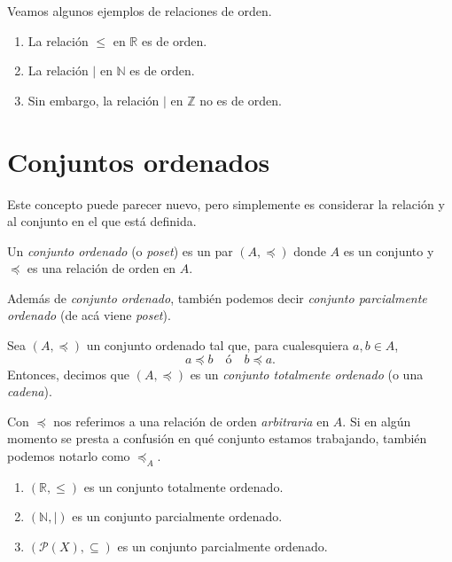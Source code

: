 Veamos algunos ejemplos de relaciones de orden.

\begin{example}
	\begin{enumerate}
		\item La relación $\leq$ en $\mathbb{R}$ es de orden.
		\item La relación $\mid$ en $\mathbb{N}$ es de orden.
		\item Sin embargo, la relación $\mid$ en $\mathbb{Z}$ no es de orden.
	\end{enumerate}
\end{example}


\section{Conjuntos ordenados}

Este concepto puede parecer nuevo, pero simplemente es considerar la relación y al conjunto en el que está definida.

\begin{definition}
	Un \emph{conjunto ordenado} (o \emph{poset}) es un par $(A, \preceq)$ donde $A$ es un conjunto y $\preceq$ es una relación de orden en $A$.
\end{definition}

Además de \textit{conjunto ordenado}, también podemos decir \textit{conjunto parcialmente ordenado} (de acá viene \textit{poset}).

\begin{definition}
	Sea $(A, \preceq)$ un conjunto ordenado tal que, para cualesquiera $a, b \in A$,
	\begin{equation*}
		a \preceq b \quad\text{ó}\quad b \preceq a.
	\end{equation*}
	Entonces, decimos que $(A, \preceq)$ es un \emph{conjunto totalmente ordenado} (o una \emph{cadena}).
\end{definition}

Con $\preceq$ nos referimos a una relación de orden \textit{arbitraria} en $A$. Si en algún momento se presta a confusión en qué conjunto estamos trabajando, también podemos notarlo como $\preceq_{A}$.

\begin{example}
	\noindent
	\begin{enumerate}
		\item $(\mathbb{R}, \leq)$ es un conjunto totalmente ordenado.
		\item $(\mathbb{N}, \mid)$ es un conjunto parcialmente ordenado.
		\item $(\mathcal{P}(X), \subseteq)$ es un conjunto parcialmente ordenado.
	\end{enumerate}
\end{example}

